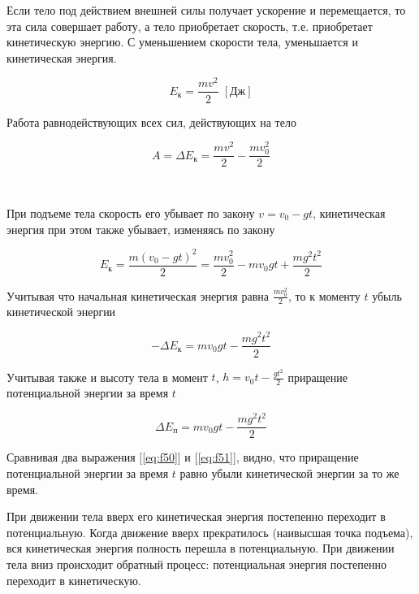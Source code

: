 \documentclass[a4paper,12pt]{article}
\begin{document}
		Если тело под действием внешней силы получает ускорение и перемещается, то эта
		сила совершает работу, а тело приобретает скорость, т.е. приобретает кинетическую 
		энергию. С уменьшением скорости тела, уменьшается и кинетическая энергия.

		\begin{equation}
			E_{\text{к}} = \frac{mv^2}{2} \; [\text{Дж}]
		\end{equation}

		Работа равнодействующих всех сил, действующих на тело

		\begin{equation}
			A = \Delta E_{\text{к}} = \frac{mv^2}{2} - \frac{mv_0^2}{2}
		\end{equation}

		\

		При подъеме тела скорость его убывает по закону $v = v_0-gt$, кинетическая энергия
		при этом также убывает, изменяясь по закону

		\begin{equation}
			E_{\text{к}} = \frac{m(v_0-gt)^2}{2} = \frac{mv_0^2}{2} - mv_0gt + \frac{mg^2t^2}{2}
		\end{equation}

		Учитывая что начальная кинетическая энергия равна $\frac{mv_0^2}{2}$, то к моменту $t$ убыль
		кинетической энергии

		\begin{equation}
			\label{eq:f50}
			-\Delta E_{\text{к}} = mv_0gt - \frac{mg^2t^2}{2}
		\end{equation}

		Учитывая также и высоту тела в момент $t$,  $h = v_0t - \frac{gt^2}{2}$ приращение 
		потенциальной энергии за время $t$

		\begin{equation}
			\label{eq:f51}
			\Delta E_{\text{п}} = mv_0gt - \frac{mg^2t^2}{2}
		\end{equation}

		Сравнивая два выражения [\ref{eq:f50}] и [\ref{eq:f51}], видно, что приращение потенциальной
		энергии за время $t$ равно убыли кинетической энергии за то же время.

		При движении тела вверх его кинетическая энергия постепенно переходит в потенциальную.
		Когда движение вверх прекратилось (наивысшая точка подъема), вся кинетическая энергия
		полность перешла в потенциальную. При движении тела вниз происходит обратный процесс:
		потенциальная энергия постепенно переходит в кинетическую.
\end{document}
